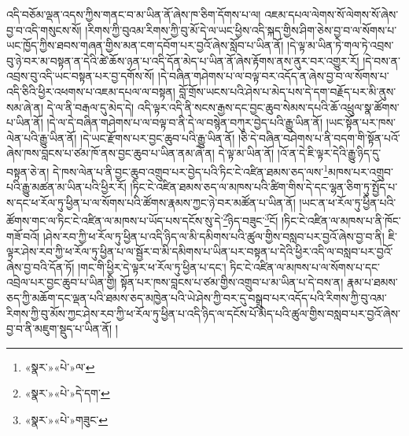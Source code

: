 འདི་བཅོམ་ལྡན་འདས་ཀྱིས་གནང་བ་མ་ཡིན་ནོ་ཞེས་ཁ་ཅིག་དོགས་པ་ལ། འཇམ་དཔལ་ལེགས་སོ་ལེགས་སོ་ཞེས་བྱ་བ་འདི་གསུངས་སོ། །རིགས་ཀྱི་བུའམ་རིགས་ཀྱི་བུ་མོ་དེ་ལ་ཡང་ཕྱིས་འདི་སྐད་གྱིས་ཤིག་ཅེས་བྱ་བ་ལ་སོགས་པ་ཡང་ཁྱོད་ཀྱིས་ཐབས་གཞན་གྱིས་མན་ངག་དབོག་པར་བྱའོ་ཞེས་སློབ་པ་ཡིན་ནོ། །དེ་ལྟ་མ་ཡིན་ཏེ་གལ་ཏེ་འབྲས་བུ་ཉེ་བར་མ་བསྟན་ན་དེའི་ཚེ་ཆོས་ཉན་པ་འདི་དོན་མེད་པ་ཡིན་ནོ་ཞེས་རྟོགས་ནས་ནུར་བར་འགྱུར་རོ། །དེ་བས་ན་འབྲས་བུ་འདི་ཡང་བསྟན་པར་བྱ་དགོས་སོ། །དེ་བཞིན་གཤེགས་པ་ལ་བལྟ་བར་འདོད་ན་ཞེས་བྱ་བ་ལ་སོགས་པ་འདི་ཅིའི་ཕྱིར་འཕགས་པ་འཇམ་དཔལ་ལ་བསྟན། བློ་གྲོས་ཡངས་པའི་ཤེས་པ་མེད་པས་དེ་དག་བརྗོད་པར་མི་ནུས་སམ་ཞེ་ན། དེ་ལ་ནི་བརྒལ་དུ་མེད་དེ། འདི་ལྟར་འདི་ནི་སངས་རྒྱས་དང་བྱང་ཆུབ་སེམས་དཔའི་ཆོ་འཕྲུལ་སྣ་ཚོགས་པ་ཡིན་ནོ། །དེ་ལ་དེ་བཞིན་གཤེགས་པ་ལ་བལྟ་བ་ནི་དེ་ལ་བསྙེན་བཀུར་བྱེད་པའི་རྒྱུ་ཡིན་ནོ། །ཡང་སྟོན་པར་ཁས་ལེན་པའི་རྒྱུ་ཡིན་ནོ། །དེ་ཡང་རྫོགས་པར་བྱང་ཆུབ་པའི་རྒྱུ་ཡིན་ནོ། །ཅི་དེ་བཞིན་བཤེགས་པ་ནི་བདག་གི་སྟོན་པའོ་ཞེས་ཁས་བླངས་པ་ཙམ་ཁོ་ནས་བྱང་ཆུབ་པ་ཡིན་ནམ་ཞེ་ན། དེ་ལྟ་མ་ཡིན་ནོ། །འོ་ན་དེ་ཇི་ལྟར་དེའི་རྒྱུ་ཉིད་དུ་བསྟན་ཅེ་ན། དེ་ཁས་ལེན་པ་ནི་བྱང་ཆུབ་འགྲུབ་པར་བྱེད་པའི་ཏིང་ངེ་འཛིན་ཐམས་ཅད་ལས་\footnote{«སྣར་»«པེ་»ལ་}མཁས་པར་འགྲུབ་པའི་རྒྱུ་མཚན་མ་ཡིན་པའི་ཕྱིར་རོ། །ཏིང་ངེ་འཛིན་ཐམས་ཅད་ལ་མཁས་པའི་ཚིག་གིས་དེ་དང་ལྷན་ཅིག་ཏུ་སྤྱོད་པ་ས་དང་ཕ་རོལ་ཏུ་ཕྱིན་པ་ལ་སོགས་པའི་ཚོགས་རྣམས་ཀྱང་ཉེ་བར་མཚོན་པ་ཡིན་ནོ། །ཡང་ན་ཕ་རོལ་ཏུ་ཕྱིན་པའི་ཚོགས་གང་ལ་ཏིང་ངེ་འཛིན་ལ་མཁས་པ་ཡོད་པས་དངོས་སུ་དེ་\footnote{«སྣར་»«པེ་»དེ་དག་}ཉིད་བཟུང་\footnote{«སྣར་»«པེ་»གཟུང་}ངོ། །ཏིང་ངེ་འཛིན་ལ་མཁས་པ་ནི་ཁོང་གཟོ་བའོ། །ཤེས་རབ་ཀྱི་ཕ་རོལ་ཏུ་ཕྱིན་པ་འདི་ཉིད་ལ་མི་དམིགས་པའི་ཚུལ་གྱིས་བསླབ་པར་བྱའོ་ཞེས་བྱ་བ་ནི། ཇི་ལྟར་ཤེས་རབ་ཀྱི་ཕ་རོལ་ཏུ་ཕྱིན་པ་ལ་སྦྱོར་བ་མི་དམིགས་པ་ཡིན་པར་བསྟན་པ་དེའི་ཕྱིར་འདི་ལ་བསླབ་པར་བྱའོ་ཞེས་བྱ་བའི་དོན་ཏོ། །གང་གི་ཕྱིར་དེ་ལྟར་ཕ་རོལ་ཏུ་ཕྱིན་པ་དང་། ཏིང་ངེ་འཛིན་ལ་མཁས་པ་ལ་སོགས་པ་དང་འབྲེལ་པར་བྱང་ཆུབ་པ་ཡིན་གྱི། སྟོན་པར་ཁས་བླངས་པ་ཙམ་གྱིས་འགྲུབ་པ་མ་ཡིན་པ་དེ་བས་ན། རྣམ་པ་ཐམས་ཅད་ཀྱི་མཆོག་དང་ལྡན་པའི་ཐམས་ཅད་མཁྱེན་པའི་ཡེ་ཤེས་ཀྱི་བར་དུ་བསྒྲུབ་པར་འདོད་པའི་རིགས་ཀྱི་བུ་འམ་རིགས་ཀྱི་བུ་མོས་ཀྱང་ཤེས་རབ་ཀྱི་ཕ་རོལ་ཏུ་ཕྱིན་པ་འདི་ཉིད་ལ་དངོས་པོ་མེད་པའི་ཚུལ་གྱིས་བསླབ་པར་བྱའོ་ཞེས་བྱ་བ་ནི་མཇུག་སྡུད་པ་ཡིན་ནོ། །
